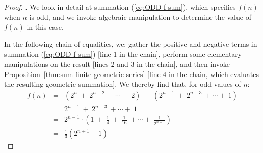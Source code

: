 \begin{proof}
\bigskip

.
We look in detail at summation (\ref{eq:ODD-f-sum}), which specifies $f(n)$ when $n$ is odd, and we invoke algebraic manipulation to determine the value of $f(n)$ in this case.

In the following chain of equalities, we: gather the positive and negative terms in summation (\ref{eq:ODD-f-sum}) [line 1 in the chain], perform some elementary manipulations on the result [lines 2 and 3 in the chain], and then invoke Proposition~\ref{thm:sum-finite-geometric-series} [line 4 in the chain, which evaluates the resulting geometric summation].   We
thereby find that, for odd values of $n$:
\begin{eqnarray*}
\label{eq:ODD-soln-f-sum}
f(n)
  & = &
\left(2^{n} \ + \ 2^{n-2} \ + \cdots + \ 2 \right) \ - \
  \left(2^{n-1} \ + \ 2^{n-3} \ + \cdots + \ 1 \right) \\
    & = &
2^{n-1} \ + \ 2^{n-3} \ + \cdots + \ 1  \\
    & = &
2^{n-1} \cdot \left( 1 \ + \ \frac{1}{4} \ + \ \frac{1}{16}  \ +
\cdots + \ \frac{1}{2^{n-1}} \right) \\
    & = &
\frac{1}{3} \left(2^{n+1} - 1 \right) 
\end{eqnarray*}

\bigskip


\end{proof}

